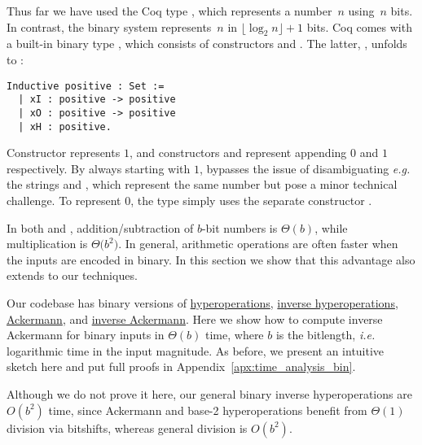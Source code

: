 Thus far we have used the Coq type , which represents
a number~$n$ using~$n$ bits.
In contrast, the binary system represents~$n$ in $\lfloor \log_{2} n \rfloor + 1$ bits.
Coq comes with a built-in binary type , 
which consists
of constructors  and . The latter, , unfolds to :

\begin{lstlisting}
Inductive positive : Set :=
  | xI : positive -> positive 
  | xO : positive -> positive
  | xH : positive.
\end{lstlisting}

Constructor  represents $1$, and constructors  and  represent
appending $0$ and $1$ respectively.
By always starting with $1$,  bypasses
the issue of disambiguating \emph{e.g.} the strings  and
, which represent the same number but pose
a minor technical challenge.
To represent $0$, the type  simply uses the separate constructor .

In both  and , addition/subtraction of $b$-bit
numbers is $\Theta(b)$, while multiplication is $\Theta \big(b^2\big)$.
In general, arithmetic operations are often faster when the inputs
are encoded in binary. 
In this section we show that this advantage also extends to our techniques.

Our codebase has binary versions of
	\href{https://github.com/inv-ack/inv-ack/blob/7270e64a2600b771f2b1b1b151f7d13fb2ae6c97/bin_repeater.v\#L78-L87}{\color{blue}hyperoperations},
	\href{https://github.com/inv-ack/inv-ack/blob/7270e64a2600b771f2b1b1b151f7d13fb2ae6c97/bin_applications.v\#L30-L36}{\color{blue}inverse hyperoperations},
	\href{https://github.com/inv-ack/inv-ack/blob/7270e64a2600b771f2b1b1b151f7d13fb2ae6c97/bin_repeater.v\#L157-L175}{\color{blue}Ackermann}, and
	\href{https://github.com/inv-ack/inv-ack/blob/7270e64a2600b771f2b1b1b151f7d13fb2ae6c97/bin_inv_ack.v\#L335-L342}{\color{blue}inverse Ackermann}.
Here we show how to compute inverse Ackermann for binary inputs in
$\Theta(b)$ time, where $b$ is the bitlength,
\emph{i.e.} logarithmic time in the input magnitude.
As before, we present an intuitive sketch here and put
full proofs in Appendix~\ref{apx:time_analysis_bin}.

\begin{rem}
Although we do not prove it here, our general binary inverse hyperoperations are $O(b^2)$ time,
since Ackermann and base-2 hyperoperations benefit from $\Theta(1)$ division via bitshifts,
whereas general division is $O(b^2)$.
\end{rem}

